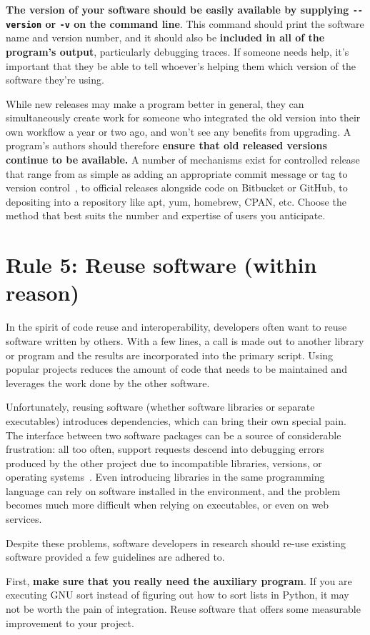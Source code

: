 \documentclass[10pt,letterpaper]{article}
\newcommand{\rulemajor}[1]{\section*{#1}}
\newcommand{\ruleminor}[1]{\textbf{#1}}
\begin{document}
\ruleminor{The version of your software should be easily available by
supplying \texttt{-\/-version} or \texttt{-v} on the command
line}. This command should print the software name and version
number, and it should also be \ruleminor{included in all of the
program's output}, particularly debugging traces.  If someone needs
help, it's important that they be able to tell whoever's helping them
which version of the software they're using.

While new releases may make a program better in general, they can
simultaneously create work for someone who integrated the old version
into their own workflow a year or two ago, and won't see any benefits
from upgrading.  A program's authors should therefore
\ruleminor{ensure that old released versions continue to be
available.}  A number of mechanisms exist for controlled release
that range from as simple as adding an appropriate commit message or
tag to version control~\cite{blischak2016}, to official releases
alongside code on Bitbucket or GitHub, to depositing into a repository
like apt, yum, homebrew, CPAN, etc. Choose the method that best suits
the number and expertise of users you anticipate.

\rulemajor{Rule 5: Reuse software (within reason)}

In the spirit of code reuse and interoperability, developers often
want to reuse software written by others.  With a few lines, a call is
made out to another library or program and the results are
incorporated into the primary script. Using popular projects reduces
the amount of code that needs to be maintained and leverages the work
done by the other software.

Unfortunately, reusing software (whether software libraries or
separate executables) introduces dependencies, which can bring their
own special pain. The interface between two software packages can be a
source of considerable frustration: all too often, support requests
descend into debugging errors produced by the other project due to
incompatible libraries, versions, or operating
systems~\cite{brown2013}. Even introducing libraries in the same
programming language can rely on software installed in the
environment, and the problem becomes much more difficult when relying
on executables, or even on web services.

Despite these problems, software developers in research should re-use
existing software provided a few guidelines are adhered to.

First, \ruleminor{make sure that you really need the auxiliary
program}. If you are executing GNU sort instead of figuring out how
to sort lists in Python, it may not be worth the pain of
integration. Reuse software that offers some measurable improvement to
your project.
\end{document}

